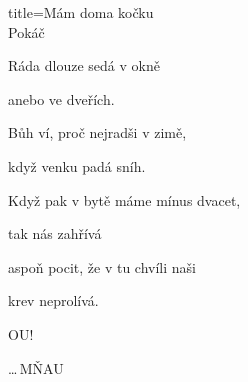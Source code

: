 \begin{song}{title=\predtitle\centering Mám doma kočku\\\large Pokáč \vspace*{-0.7cm}}
{\begin{varwidth}[t]{0.5\textwidth}

\vspace*{-0.2cm}

\sloka
   Ráda dlouze sedá v okně

   anebo ve dveřích.

   Bůh ví, proč nejradši v zimě,

   když venku padá sníh.


\sloka
   Když pak v bytě máme mínus dvacet,

   tak nás zahřívá

   aspoň pocit, že v tu chvíli naši

   krev neprolívá.

   OU!

\vspace*{-0.2cm}

\elipsa\ldots\,MŇAU

\end{varwidth}
}
\setcounter{Slokočet}{0}
\end{song}
